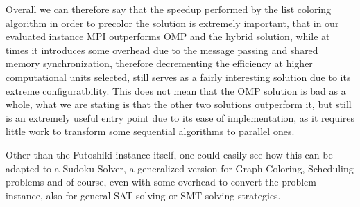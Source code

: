 Overall we can therefore say that the speedup performed by the list coloring algorithm in order to precolor the solution is extremely important, that in our evaluated instance MPI outperforms OMP and the hybrid solution, while at times it introduces some overhead due to the message passing and shared memory synchronization, therefore decrementing the efficiency at higher computational units selected, still serves as a fairly interesting solution due to its extreme configuratbility. This does not mean that the OMP solution is bad as a whole, what we are stating is that the other two solutions outperform it, but still is an extremely useful entry point due to its ease of implementation, as it requires little work to transform some sequential algorithms to parallel ones.

Other than the Futoshiki instance itself, one could easily see how this can be adapted to a Sudoku Solver, a generalized version for Graph Coloring, Scheduling problems and of course, even with some overhead to convert the problem instance, also for general SAT solving or SMT solving strategies.